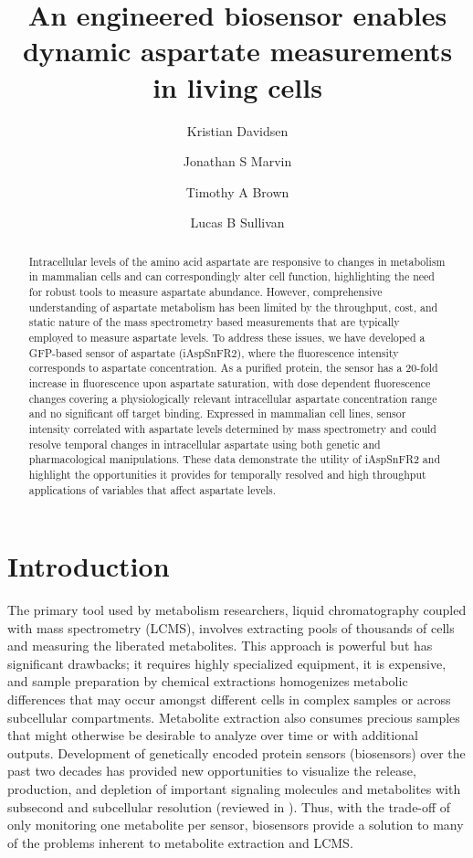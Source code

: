 \documentclass[9pt,lineno]{elife}
\title{An engineered biosensor enables dynamic aspartate measurements in living cells}
\author[1,2,\authfn{1}]{Kristian Davidsen}
\author[3,\authfn{1}*]{Jonathan S Marvin}
\author[3]{Timothy A Brown}
\author[1*]{Lucas B Sullivan}
\affil[1]{Human Biology Division, Fred Hutchinson Cancer Center, Seattle, WA, USA}
\affil[2]{Molecular and cellular biology program, University of Washington, Seattle, WA, USA}
\affil[3]{Howard Hughes Medical Institute (HHMI), Janelia Research Campus, Ashburn, VA, USA}
\begin{document}
\maketitle

\begin{abstract}
Intracellular levels of the amino acid aspartate are responsive to changes in metabolism in mammalian cells and can correspondingly alter cell function, highlighting the need for robust tools to measure aspartate abundance.
However, comprehensive understanding of aspartate metabolism has been limited by the throughput, cost, and static nature of the mass spectrometry based measurements that are typically employed to measure aspartate levels.
To address these issues, we have developed a GFP-based sensor of aspartate (iAspSnFR2), where the fluorescence intensity corresponds to aspartate concentration.
As a purified protein, the sensor has a 20-fold increase in fluorescence upon aspartate saturation, with dose dependent fluorescence changes covering a physiologically relevant intracellular aspartate concentration range and no significant off target binding.
Expressed in mammalian cell lines, sensor intensity correlated with aspartate levels determined by mass spectrometry and could resolve temporal changes in intracellular aspartate using both genetic and pharmacological manipulations.
These data demonstrate the utility of iAspSnFR2 and highlight the opportunities it provides for temporally resolved and high throughput applications of variables that affect aspartate levels.
\end{abstract}


\section{Introduction}
The primary tool used by metabolism researchers, liquid chromatography coupled with mass spectrometry (LCMS), involves extracting pools of thousands of cells and measuring the liberated metabolites.
This approach is powerful but has significant drawbacks; it requires highly specialized equipment, it is expensive, and sample preparation by chemical extractions homogenizes metabolic differences that may occur amongst different cells in complex samples or across subcellular compartments.
Metabolite extraction also consumes precious samples that might otherwise be desirable to analyze over time or with additional outputs.
Development of genetically encoded protein sensors (biosensors) over the past two decades has provided new opportunities to visualize the release, production, and depletion of important signaling molecules and metabolites with subsecond and subcellular resolution (reviewed in \cite{Kostyuk2019-qc, Koveal2020-cl}).
Thus, with the trade-off of only monitoring one metabolite per sensor, biosensors provide a solution to many of the problems inherent to metabolite extraction and LCMS.
\end{document}
